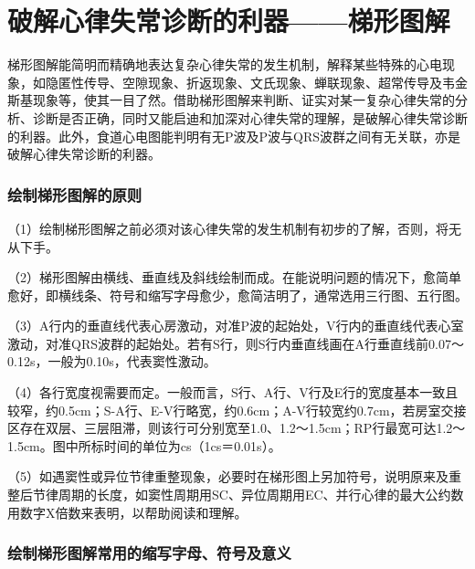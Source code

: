 \chapter{破解心律失常诊断的利器------梯形图解}

梯形图解能简明而精确地表达复杂心律失常的发生机制，解释某些特殊的心电现象，如隐匿性传导、空隙现象、折返现象、文氏现象、蝉联现象、超常传导及韦金斯基现象等，使其一目了然。借助梯形图解来判断、证实对某一复杂心律失常的分析、诊断是否正确，同时又能启迪和加深对心律失常的理解，是破解心律失常诊断的利器。此外，食道心电图能判明有无P波及P波与QRS波群之间有无关联，亦是破解心律失常诊断的利器。

\protect\hypertarget{text00017.htmlux5cux23subid121}{}{}

\subsection{绘制梯形图解的原则}

（1）绘制梯形图解之前必须对该心律失常的发生机制有初步的了解，否则，将无从下手。

（2）梯形图解由横线、垂直线及斜线绘制而成。在能说明问题的情况下，愈简单愈好，即横线条、符号和缩写字母愈少，愈简洁明了，通常选用三行图、五行图。

（3）A行内的垂直线代表心房激动，对准P波的起始处，V行内的垂直线代表心室激动，对准QRS波群的起始处。若有S行，则S行内垂直线画在A行垂直线前0.07～0.12s，一般为0.10s，代表窦性激动。

（4）各行宽度视需要而定。一般而言，S行、A行、V行及E行的宽度基本一致且较窄，约0.5cm；S-A行、E-V行略宽，约0.6cm；A-V行较宽约0.7cm，若房室交接区存在双层、三层阻滞，则该行可分别宽至1.0、1.2～1.5cm；RP行最宽可达1.2～1.5cm。图中所标时间的单位为cs（1cs＝0.01s）。

（5）如遇窦性或异位节律重整现象，必要时在梯形图上另加符号，说明原来及重整后节律周期的长度，如窦性周期用SC、异位周期用EC、并行心律的最大公约数用数字X倍数来表明，以帮助阅读和理解。

\protect\hypertarget{text00017.htmlux5cux23subid122}{}{}

\subsection{绘制梯形图解常用的缩写字母、符号及意义}

